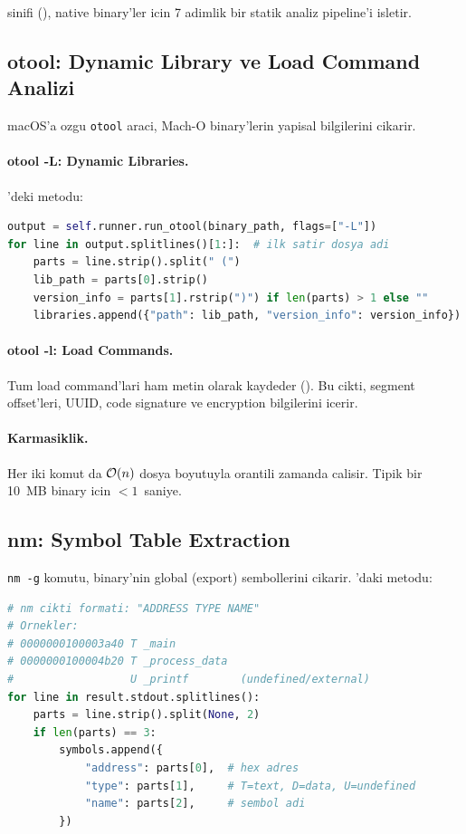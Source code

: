 sinifi (), native binary'ler icin 7 adimlik bir statik analiz pipeline'i isletir.

\subsection{otool: Dynamic Library ve Load Command Analizi}

macOS'a ozgu \texttt{otool} araci, Mach-O binary'lerin yapisal bilgilerini cikarir.

\paragraph{otool -L: Dynamic Libraries.}
'deki  metodu:

\begin{lstlisting}[language=Python, caption={otool -L cikti parse'i}]
output = self.runner.run_otool(binary_path, flags=["-L"])
for line in output.splitlines()[1:]:  # ilk satir dosya adi
    parts = line.strip().split(" (")
    lib_path = parts[0].strip()
    version_info = parts[1].rstrip(")") if len(parts) > 1 else ""
    libraries.append({"path": lib_path, "version_info": version_info})
\end{lstlisting}

\paragraph{otool -l: Load Commands.}
Tum load command'lari ham metin olarak kaydeder (). Bu cikti, segment offset'leri, UUID, code signature ve encryption bilgilerini icerir.

\paragraph{Karmasiklik.} Her iki komut da $\mathcal{O}\!\left(n\right)$ dosya boyutuyla orantili zamanda calisir. Tipik bir 10~MB binary icin $<1$~saniye.

\subsection{nm: Symbol Table Extraction}

\texttt{nm -g} komutu, binary'nin global (export) sembollerini cikarir. 'daki  metodu:

\begin{lstlisting}[language=Python, caption={nm cikti formati}]
# nm cikti formati: "ADDRESS TYPE NAME"
# Ornekler:
# 0000000100003a40 T _main
# 0000000100004b20 T _process_data
#                  U _printf        (undefined/external)
for line in result.stdout.splitlines():
    parts = line.strip().split(None, 2)
    if len(parts) == 3:
        symbols.append({
            "address": parts[0],  # hex adres
            "type": parts[1],     # T=text, D=data, U=undefined
            "name": parts[2],     # sembol adi
        })
\end{lstlisting}

